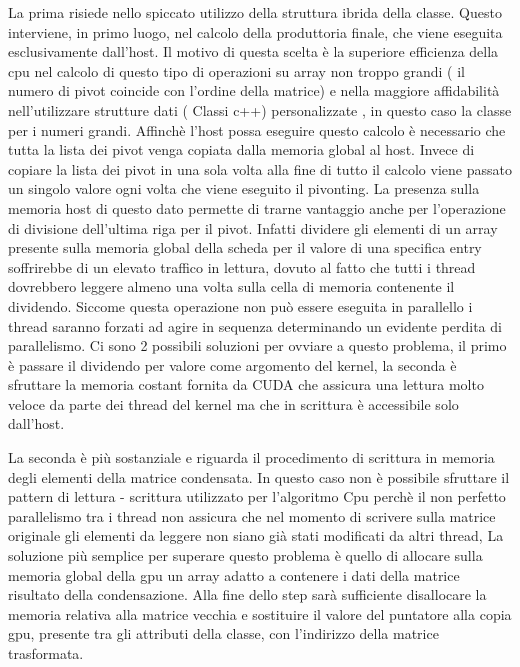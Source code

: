 \documentclass{article}
\begin{document}
La prima risiede nello spiccato utilizzo della struttura ibrida della classe. 
Questo interviene, in primo luogo, nel calcolo della produttoria finale, che viene eseguita esclusivamente dall'host.
Il motivo di questa scelta è la superiore efficienza della cpu nel calcolo di questo tipo di operazioni su array non troppo grandi ( il numero di pivot coincide con l'ordine della matrice) e nella maggiore affidabilità nell'utilizzare strutture dati ( Classi c++) personalizzate , in questo caso la classe per i numeri grandi.
Affinchè l'host possa eseguire questo calcolo è necessario che tutta la lista dei pivot venga copiata dalla memoria global al host.
\newline
Invece di copiare la lista dei pivot in una sola volta alla fine di tutto il calcolo viene passato un singolo valore ogni volta che viene eseguito il pivonting.
La presenza sulla memoria host di questo dato permette di trarne vantaggio anche per l'operazione di divisione dell'ultima riga per il pivot.
Infatti dividere gli elementi di un array presente sulla memoria global della scheda per il valore di una specifica entry soffrirebbe di un elevato traffico in lettura, dovuto al fatto che tutti i thread dovrebbero leggere almeno una volta sulla cella di memoria contenente il dividendo. Siccome questa operazione non può essere eseguita in parallello i thread saranno forzati ad agire in sequenza  determinando un evidente perdita di parallelismo.
Ci sono 2 possibili soluzioni per ovviare a questo problema, il primo è passare il dividendo per valore come argomento del kernel, la seconda è sfruttare la memoria costant fornita da CUDA che assicura una lettura molto veloce da parte dei thread del kernel ma che in scrittura è accessibile solo dall'host.

La seconda è più sostanziale e riguarda il procedimento di scrittura in memoria degli elementi della matrice condensata.
In questo caso non è possibile sfruttare il pattern di lettura - scrittura utilizzato per l'algoritmo Cpu perchè il non perfetto parallelismo tra i thread non assicura che nel momento di scrivere sulla matrice originale gli elementi da leggere non siano già stati modificati da altri thread,
La soluzione più semplice per superare questo problema è quello di allocare sulla memoria global della gpu un array adatto a contenere i dati della matrice risultato della condensazione. Alla fine dello step sarà sufficiente disallocare la memoria relativa alla matrice vecchia e sostituire il valore del puntatore alla copia gpu, presente tra gli attributi della classe, con l'indirizzo della matrice trasformata.
\end{document}
